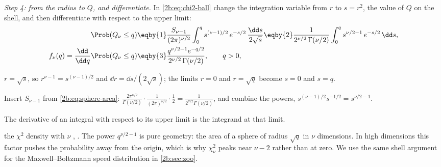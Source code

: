 \emph{Step 4: from the radius to $Q$, and differentiate.} In \eqref{2b:eq:chi2-ball} change the integration variable from $r$ to $s=r^2$, the value of $Q$ on the shell, and then differentiate with respect to the upper limit:
\begin{align}
  \Prob(Q_\nu\le q)
  &\eqby{1} \frac{S_{\nu-1}}{(2\pi)^{\nu/2}}\int_0^{q}s^{(\nu-1)/2}\,e^{-s/2}\,\frac{\dd s}{2\sqrt s}
   \eqby{2} \frac{1}{2^{\nu/2}\,\Gamma(\nu/2)}\int_0^{q}s^{\nu/2-1}\,e^{-s/2}\,\dd s ,
  \nonumber\\
  f_\nu(q)=\frac{\dd}{\dd q}\Prob(Q_\nu\le q)
  &\eqby{3} \frac{q^{\nu/2-1}e^{-q/2}}{2^{\nu/2}\,\Gamma(\nu/2)} ,\qquad q>0 ,
  \label{2b:eq:chi2}
\end{align}
\begin{explain}
  \item $r=\sqrt s$, so $r^{\nu-1}=s^{(\nu-1)/2}$ and $\dd r=\dd s/(2\sqrt s)$; the limits $r=0$ and $r=\sqrt q$ become $s=0$ and $s=q$.
  \item Insert $S_{\nu-1}$ from \eqref{2b:eq:sphere-area}: $\frac{2\pi^{\nu/2}}{\Gamma(\nu/2)}\cdot\frac{1}{(2\pi)^{\nu/2}}\cdot\frac12=\frac{1}{2^{\nu/2}\Gamma(\nu/2)}$, and combine the powers, $s^{(\nu-1)/2}s^{-1/2}=s^{\nu/2-1}$.
  \item The derivative of an integral with respect to its upper limit is the integrand at that limit.
\end{explain}
the $\chi^2$ density with $\nu$  , . The power $q^{\nu/2-1}$ is pure geometry: the area of a sphere of radius $\sqrt q$ in $\nu$ dimensions. In high dimensions this factor pushes the probability away from the origin, which is why $\chi^2_\nu$ peaks near $\nu-2$ rather than at zero. We use the same shell argument for the Maxwell--Boltzmann speed distribution in \cref{2b:sec:zoo}.

